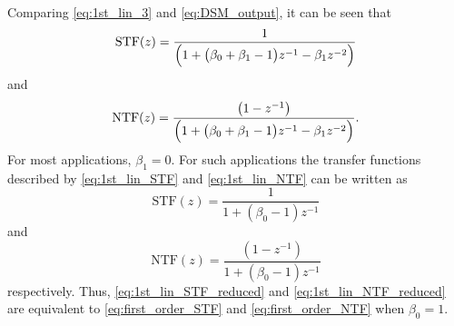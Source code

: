 Comparing \eqref{eq:1st_lin_3} and \eqref{eq:DSM_output}, it can be seen that
\begin{equation}\label{eq:1st_lin_STF}
   \text{STF}(z)=
\frac{1}{\Bigl(1+\bigl(\beta_{0}+\beta_{1}-1\bigr)z^{-1}-\beta_{1}z^{-2}\Bigr)}
\end{equation}
and
\begin{equation}\label{eq:1st_lin_NTF}
 \text{NTF}(z)=
	\frac{\bigl(1-z^{-1}\bigr)}{\Bigl(1+\bigl(\beta_{0}+\beta_{1}-1\bigr)z^{-1}-
	\beta_{1}z^{-2}\Bigr)}\text{.}
\end{equation}
For most applications, $\beta_1=0$. For such applications the transfer
functions described by \eqref{eq:1st_lin_STF} and \eqref{eq:1st_lin_NTF} can be
written as
\begin{equation}\label{eq:1st_lin_STF_reduced}
   \text{STF}(z)=
\frac{1}{1+\left(\beta_{0}-1\right)z^{-1}}
\end{equation}
and
\begin{equation}\label{eq:1st_lin_NTF_reduced}
 \text{NTF}(z)=
	\frac{\left(1-z^{-1}\right)}{1+\left(\beta_{0}-1\right)z^{-1}}
\end{equation}
respectively. Thus, \eqref{eq:1st_lin_STF_reduced} and \eqref{eq:1st_lin_NTF_reduced} are
equivalent to \eqref{eq:first_order_STF} and \eqref{eq:first_order_NTF} when $\beta_0=1$.

